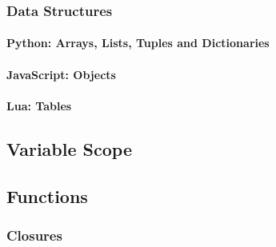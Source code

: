 \subsubsection{Data Structures}


\paragraph{Python: Arrays, Lists, Tuples and Dictionaries}


\paragraph{JavaScript: Objects}


\paragraph{Lua: Tables}


\subsection{Variable Scope}
\label{varscope}


\subsection{Functions}


\subsubsection{Closures}
\label{closures}

